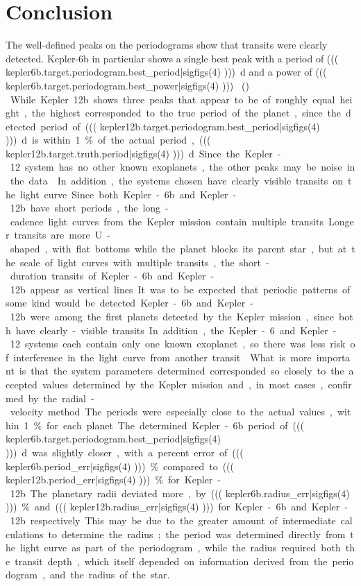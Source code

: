 \section{Conclusion}

The well-defined peaks on the periodograms show that transits were clearly detected. Kepler-6b in particular shows a single
best peak with a period of \SI{((( kepler6b.target.periodogram.best_period|sigfigs(4) )))}{\day} and a
power of \SI{((( kepler6b.target.periodogram.best_power|sigfigs(4) )))}{ (\electron\per\second)  \per \day{} }. While Kepler 12b
shows three peaks that appear to be of roughly equal height, the highest corresponded to the true period of the planet, since the detected
period of \SI{((( kepler12b.target.periodogram.best_period|sigfigs(4) )))}{\day} is within \SI{1}{\percent} of the actual period, \SI{((( kepler12b.target.truth.period|sigfigs(4) )))}{\day}.
Since the Kepler-12 system has no other known exoplanets, the other peaks may be noise in the data. \autocite{exoplanetArchive}.
In addition, the systems chosen have clearly visible transits on the light curve. Since both Kepler-6b and Kepler-12b have short periods,
the long-cadence light curves from the Kepler mission contain multiple transits. Longer transits are more U-shaped, with flat bottoms while the
planet blocks its parent star, but at the scale of light curves with multiple transits, the short-duration transits of Kepler-6b and Kepler-12b
appear as vertical lines.

It was to be expected that periodic patterns of some kind would be detected. Kepler-6b and Kepler-12b were among the first planets
detected by the Kepler mission, since both have clearly-visible transits. In addition, the Kepler-6 and Kepler-12 systems each contain
only one known exoplanet, so there was less risk of interference in the light curve from another transit. \autocite{exoplanetArchive}. What is
more important is that the system parameters determined corresponded so closely to the accepted values determined by the Kepler mission
and, in most cases, confirmed by the radial-velocity method. The periods were especially close to the actual values, within \SI{1}{\percent} for
each planet. The determined Kepler-6b period of \SI{((( kepler6b.target.periodogram.best_period|sigfigs(4) )))}{\day} was slightly closer, with a percent error of
\SI{((( kepler6b.period_err|sigfigs(4) )))}{\percent} compared to \SI{((( kepler12b.period_err|sigfigs(4) )))}{\percent} for Kepler-12b. The planetary
radii deviated more, by \SI{((( kepler6b.radius_err|sigfigs(4) )))}{\percent} and \SI{((( kepler12b.radius_err|sigfigs(4) )))} for Kepler-6b and Kepler-12b
respectively. This may be due to the greater amount of intermediate calculations to determine the radius; the period was determined directly from the light curve
as part of the periodogram, while the radius required both the transit depth, which itself depended on information derived from the periodogram, and the radius
of the star.

